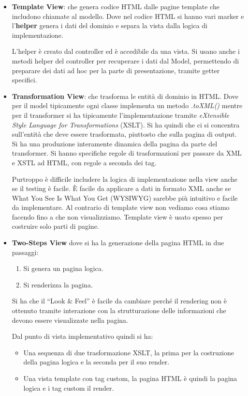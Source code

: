 \begin{itemize}
    \item \textbf{Template View}: che genera codice HTML dalle pagine template
          che includono chiamate al modello. Dove nel codice HTML si hanno vari marker
          e l'\textbf{helper} genera i dati del dominio e separa la vista dalla logica
          di implementazione.

          L'helper è creato dal controller ed è accedibile da una vista. Si usano
          anche i metodi helper del controller per recuperare i dati dal Model,
          permettendo di preparare dei dati ad hoc per la parte di presentazione,
          tramite getter specifici.
    \item \textbf{Transformation View}: che trasforma le entità di dominio in HTML.
          Dove per il model tipicamente ogni classe implementa un metodo \textit{.toXML()}
          mentre per il transformer si ha tipicamente l'implementazione tramite
          \textit{eXtensible Style Language for Transformations} (XSLT). Si ha quindi che ci
          si concentra sull'entità che deve essere trasformata, piuttosto che sulla pagina
          di output. Si ha una produzione interamente dinamica della pagina da parte del
          transformer. Si hanno specifiche regole di trasformazioni per passare da XML e
          XSTL ad HTML, con regole a seconda dei tag.

          Purtroppo è difficile includere la logica di implementazione nella view
          anche se il testing è facile. È facile da applicare a dati in formato
          XML anche se What You See Is What You Get (WYSIWYG) sarebbe più intuitivo e
          facile da implementare. Al contrario di template view non vediamo cosa
          stiamo facendo fino a che non visualizziamo. Template view è usato spesso
          per costruire solo parti di pagine.
    \item \textbf{Two-Steps View} dove si ha la generazione della pagina HTML in
          due passaggi:
          \begin{enumerate}
              \item Si genera un pagina logica.
              \item Si renderizza la pagina.
          \end{enumerate}
          Si ha che il “Look \& Feel” è facile da cambiare perché il rendering
          non è ottenuto tramite interazione con la strutturazione delle informazioni
          che devono essere visualizzate nella pagina.

          Dal punto di vista implementativo quindi si ha:
          \begin{itemize}
              \item Una sequenza di due trasformazione XSLT, la prima per la
                    costruzione della pagina logica e la seconda per il suo render.
              \item Una vista template con tag custom, la pagina HTML è quindi
                    la pagina logica e i tag custom il render.
          \end{itemize}
\end{itemize}
